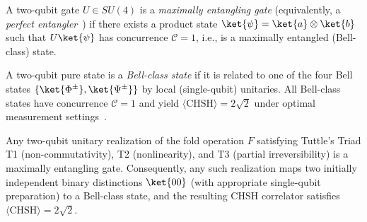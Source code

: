 \begin{definition}
\label{def:perfect_entangler_weak}
A two-qubit gate $U \in SU(4)$ is a \emph{maximally entangling gate}
(equivalently, a \emph{perfect entangler}~\cite{Zhang2003}) if there
exists a product state $\ket{\psi} = \ket{a}\otimes\ket{b}$ such that
$U\ket{\psi}$ has concurrence $\mathcal{C} = 1$, i.e., is a maximally
entangled (Bell-class) state.
\end{definition}

\begin{definition}
A two-qubit pure state is a \emph{Bell-class state} if it is related
to one of the four Bell states
$\{\ket{\Phi^\pm}, \ket{\Psi^\pm}\}$ by local (single-qubit) unitaries.
All Bell-class states have concurrence $\mathcal{C} = 1$ and yield
$\langle\mathrm{CHSH}\rangle = 2\sqrt{2}$ under optimal measurement
settings~\cite{Cirelson1980}.
\end{definition}

\begin{theorem}
\label{thm:weak_selection}
Any two-qubit unitary realization of the fold operation $F$ satisfying
Tuttle's Triad T1 (non-commutativity), T2 (nonlinearity), and T3
(partial irreversibility) is a maximally entangling gate. Consequently,
any such realization maps two initially independent binary distinctions
$\ket{00}$ (with appropriate single-qubit preparation) to a Bell-class
state, and the resulting CHSH correlator satisfies
$\langle\mathrm{CHSH}\rangle = 2\sqrt{2}$.
\end{theorem}

